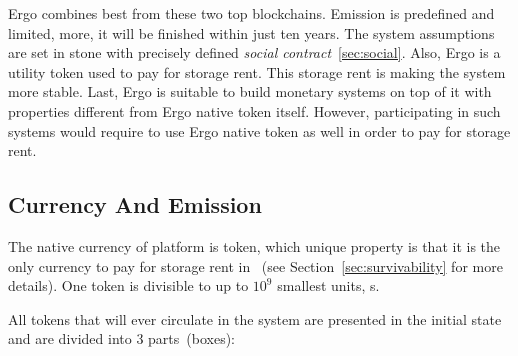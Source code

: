  Ergo combines best from these two top blockchains. Emission is predefined and limited, more, it will be finished within
 just ten years. The system assumptions are set in stone with precisely defined {\em social contract}~\ref{sec:social}. Also,
 Ergo is a utility token used to pay for storage rent. This storage rent is making the system more stable. Last, Ergo is
 suitable to build monetary systems on top of it with properties different from Ergo native token itself. However,
 participating in such systems would require to use Ergo native token as well in order to pay for storage rent.


\subsection{Currency And Emission}
\label{sec:currency}

The native currency of \Ergo{} platform is \Erg{} token, which unique property is
that it is the only currency to pay for storage rent in \Ergo{}~(see Section~\ref{sec:survivability} for more details).
One \Erg{} token is divisible to up to $10^9$ smallest units, \nanoErg{}s.

All \Erg{} tokens that will ever circulate in the system are presented in
the initial state and are divided into 3 parts~(boxes):


